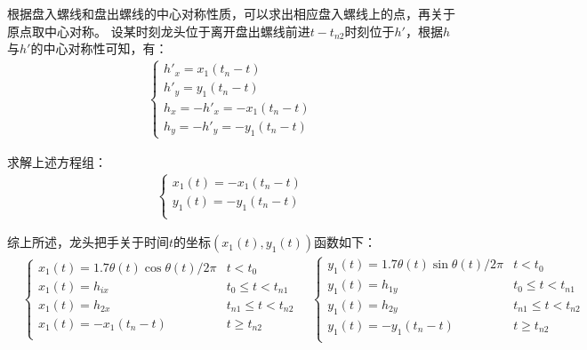 \documentclass{cumcmthesis1}
\begin{document}
根据盘入螺线和盘出螺线的中心对称性质，可以求出相应盘入螺线上的点，再关于原点取中心对称。
设某时刻龙头位于离开盘出螺线前进$t-t_{n2}$时刻位于$h'$，根据$h$与$h'$的中心对称性可知，有：
\begin{align}
    \begin{cases}
        h'_x=x_1(t_n-t)\\
        h'_y=y_1(t_n-t)\\
        h_x=-h'_x=-x_1(t_n-t)\\
        h_y=-h'_y=-y_1(t_n-t)
    \end{cases}
\end{align}
\par
求解上述方程组：
\begin{align}
    \begin{cases}
        x_1(t)=-x_1(t_n-t)\\
        y_1(t)=-y_1(t_n-t)\\
    \end{cases}
\end{align}
\par
综上所述，龙头把手关于时间$t$的坐标$(x_1(t),y_1(t))$函数如下：
\begin{equation}
    \begin{aligned}
        & \begin{cases}
            x_1(t)=1.7 \theta(t) \cos \theta(t)/2 \pi & t<t_0\\
            x_1(t)=h_{ix} & t_0 \leq t<t_{n1} \\
            x_1(t) = h_{2x} & t_{n1} \leq t< t_{n2} \\
            x_1(t)=-x_1(t_n-t)  & t \geq  t_{n2} \\
        \end{cases}
        \quad
        \begin{cases}
            y_1(t)=1.7 \theta(t) \sin \theta(t)/2 \pi & t<t_0\\
            y_1(t)=h_{1y} & t_0 \leq t<t_{n1} \\
            y_1(t) = h_{2y} & t_{n1} \leq t< t_{n2} \\
            y_1(t)=-y_1(t_n-t) & t \geq  t_{n2} \\
        \end{cases}
    \end{aligned}
\end{equation}
\end{document}
